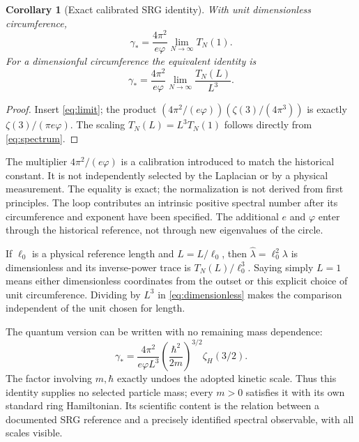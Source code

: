 \documentclass[11pt,a4paper]{article}
\newtheorem{corollary}[theorem]{Corollary}
\theoremstyle{definition}\newtheorem{definition}[theorem]{Definition}
\theoremstyle{remark}\newtheorem{remark}[theorem]{Remark}
\newcommand{\phig}{\varphi}\newcommand{\AN}{A_{N,L}}
\numberwithin{equation}{section}
\begin{document}
\begin{corollary}[Exact calibrated SRG identity]\label{cor:calibration}
With unit dimensionless circumference,
\begin{equation}
 \boxed{\displaystyle
 \gamma_*=\frac{4\pi^2}{e\phig}\lim_{N\to\infty}T_N(1).}
 \label{eq:calibration}
\end{equation}
For a dimensionful circumference the equivalent identity is
\begin{equation}
 \gamma_*=\frac{4\pi^2}{e\phig}
           \lim_{N\to\infty}\frac{T_N(L)}{L^3}.
 \label{eq:dimensionless}
\end{equation}
\end{corollary}
\begin{proof}
Insert \eqref{eq:limit}; the product
\((4\pi^2/(e\phig))(\zeta(3)/(4\pi^3))\)
is exactly \(\zeta(3)/(\pi e\phig)\).
The scaling \(T_N(L)=L^3T_N(1)\) follows directly from
\eqref{eq:spectrum}.
\end{proof}

The multiplier \(4\pi^2/(e\phig)\) is a calibration introduced to match
the historical constant. It is not independently selected by the
Laplacian or by a physical measurement. The equality is exact; the
normalization is not derived from first principles.
The loop contributes an intrinsic positive spectral number after its
circumference and exponent have been specified. The additional \(e\) and
\(\phig\) enter through the historical reference, not through new
eigenvalues of the circle.

If \(\ell_0\) is a physical reference length and \(\widehat L=L/\ell_0\),
then \(\widehat\lambda=\ell_0^2\lambda\) is dimensionless and its
inverse-power trace is \(T_N(L)/\ell_0^3\). Saying simply \(L=1\)
means either dimensionless coordinates from the outset or this explicit
choice of unit circumference. Dividing by \(L^3\) in
\eqref{eq:dimensionless} makes the comparison independent of the unit
chosen for length.

The quantum version can be written with no remaining mass dependence:
\begin{equation}
 \gamma_*=\frac{4\pi^2}{e\phig L^3}
 \left(\frac{\hbar^2}{2m}\right)^{3/2}
       \zeta_H(3/2).
 \label{eq:qcalibration}
\end{equation}
The factor involving \(m,\hbar\) exactly undoes the adopted kinetic scale.
Thus this identity supplies no selected particle mass; every \(m>0\)
satisfies it with its own standard ring Hamiltonian.
Its scientific content is the relation between a documented SRG
reference and a precisely identified spectral observable, with all
scales visible.
\end{document}
